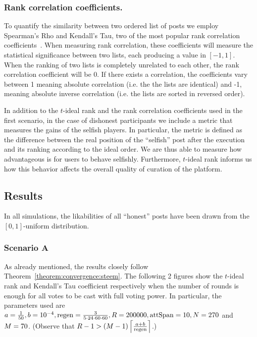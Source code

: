     \subsubsection*{Rank correlation coefficients.}
      To quantify the similarity between two ordered list of posts we employ
      Spearman's Rho and Kendall's Tau, two of the most popular rank correlation
      coefficients~\cite{kendall1955rank}. When measuring rank correlation,
      these coefficients will measure the statistical significance between two
      lists, each producing a value in $\left[-1, 1\right]$. When the ranking of
      two lists is completely unrelated to each other, the rank correlation
      coefficient will be 0. If there exists a correlation, the coefficients
      vary between 1 meaning absolute correlation (i.e. the the lists are
      identical) and -1, meaning absolute inverse correlation (i.e. the lists
      are sorted in reversed order).

    In addition to the $t$-ideal rank and the rank correlation coefficients used
    in the first scenario, in the case of dishonest participants we include a
    metric that measures the gains of the selfish players. In particular, the
    metric is defined as the difference between the real position of the
    ``selfish'' post after the execution and its ranking according to the ideal
    order. We are thus able to measure how advantageous is for users to behave
    selfishly. Furthermore, $t$-ideal rank informs us how this behavior affects
    the overall quality of curation of the platform.

  \subsection{Results}
    In all simulations, the likabilities of all ``honest'' posts have been drawn
    from the $\left[0, 1\right]$-uniform distribution.

    \subsubsection*{Scenario A}
      As already mentioned, the results closely follow
      Theorem~\ref{theorem:convergence:steem}. The following 2 figures show
      the $t$-ideal rank and Kendall's Tau coefficient respectively when the
      number of rounds is enough for all votes to be cast with full voting
      power. In particular, the parameters used are $a = \frac{1}{50}, b =
      10^{-4}, \regen = \frac{3}{5 \cdot 24 \cdot 60 \cdot 60}, \rounds =
      200000, \attspan = 10, \playerlen = 270$ and $\postlen = 70$. (Observe
      that $\rounds - 1 > \left(\postlen - 1\right)\ceil*{\frac{a +
      b}{\regen}}$.)


